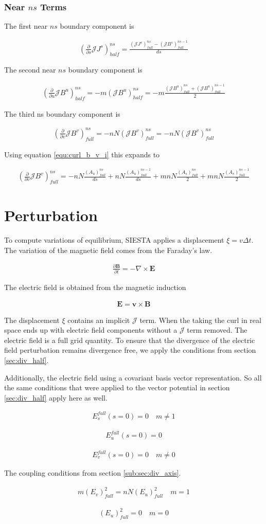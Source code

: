 \documentclass[11pt]{article}
\newcommand{\brackets}[1]{\left(#1\right)}
\renewcommand{\vec}[1]{\boldsymbol#1}
\newcommand{\pd}[2]{\frac{\partial#1}{\partial#2}}
\newcommand{\equ}[2]{
	\begin{equation}
    \begin{split}
	#1
	\label{#2}
	\end{split}
	\end{equation}
}
\newcommand{\crossp}[2]{#1\times#2}
\newcommand{\curl}[1]{\crossp{\nabla}{#1}}
\begin{document}
\subsubsection{Near $ns$ Terms}
The first near $ns$ boundary component is
\equ{
\brackets{\frac{\partial}{\partial s}\mathcal{J}J^{s}}^{ns}_{half}=\frac{\brackets{\mathcal{J}J^{s}}^{ns}_{full}-\brackets{\mathcal{J}B^{s}}^{ns-1}_{full}}{ds}
}{equ:div_jj_s_ns}
The second near $ns$ boundary component is
\equ{
\brackets{\frac{\partial}{\partial u}\mathcal{J}B^{u}}^{ns}_{half}=-m\brackets{\mathcal{J}B^{u}}^{ns}_{half}=-m\frac{\brackets{\mathcal{J}B^{u}}^{ns}_{full}+\brackets{\mathcal{J}B^{u}}^{ns-1}_{full}}{2}
}{equ:div_jj_u_ns}
The third ns boundary component is
\equ{
\brackets{\frac{\partial}{\partial v}\mathcal{J}B^{v}}^{ns}_{full}=-nN\brackets{\mathcal{J}B^{v}}^{ns}_{full}=-nN\brackets{\mathcal{J}B^{v}}^{ns}_{full}
}{equ:div_jjM_v_ns}
Using equation \ref{equ:curl_b_v_i} this expands to
\equ{
\brackets{\frac{\partial}{\partial v}\mathcal{J}B^{v}}^{ns}_{full}=-nN\frac{\brackets{A_{u}}^{ns}_{full}}{ds}+nN\frac{\brackets{A_{u}}^{ns-1}_{full}}{ds}+mnN\frac{\brackets{A_{s}}^{ns}_{full}}{2}+mnN\frac{\brackets{A_{s}}^{ns-1}_{full}}{2}
}{equ:div_jj_v_ns_1}

\section{Perturbation}
\label{sec:perturbation}
To compute variations of equilibrium, SIESTA applies a displacement $\xi=v\Delta t$.
The variation of the magnetic field comes from the Faraday's law.
\equ{
\pd{\vec{B}}{t}=-\curl{\vec{E}}
}{equ:faraday}
The electric field is obtained from the magnetic induction
\equ{
\vec{E}=\crossp{\vec{v}}{\vec{B}}
}{equ:e_field}
The displacement $\xi$ contains an implicit $\mathcal{J}$ term.
When the taking the curl in real space ends up with electric field components without a $\mathcal{J}$ term removed.
The electric field is a full grid quantity.
To ensure that the divergence of the electric field perturbation remains divergence free, we apply the conditions from section \ref{sec:div_half}.

Additionally, the electric field using a covariant basis vector representation.
So all the same conditions that were applied to the vector potential in section \ref{sec:div_half} apply here as well.
\equ{
E^{full}_{s}\brackets{s=0}=0\quad m \ne 1
}{equ:covariant_e_boundary_s}
\equ{
E^{full}_{u}\brackets{s=0}=0
}{equ:covariant_e_boundary_u}
\equ{
E^{full}_{v}\brackets{s=0}=0\quad m \ne 0
}{equ:covariant_e_boundary_v}
The coupling conditions from section \ref{sub:sec:div_axis}.
\equ{
m\brackets{E_v}^{2}_{full}=nN\brackets{E_u}^{2}_{full}\quad m = 1
}{equ:covariant_e_s2_m1_couple}
\equ{
\brackets{E_u}^{2}_{full}=0\quad m=0
}{equ:covariant_eu_s2_m0}
\end{document}

